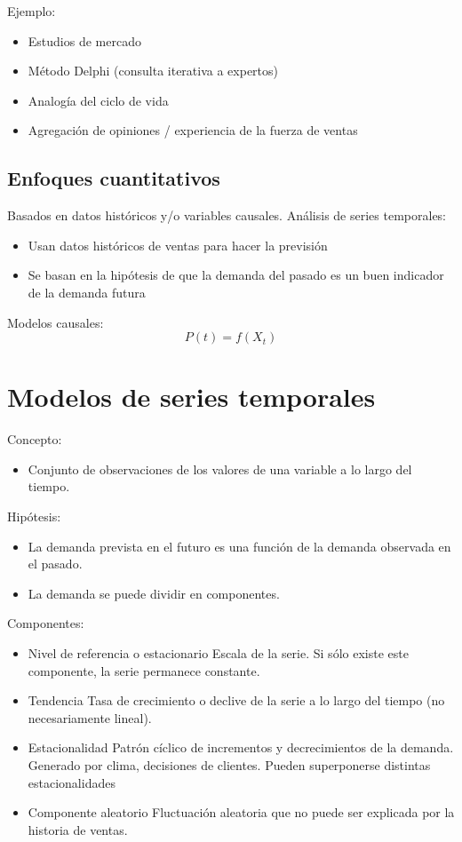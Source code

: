 Ejemplo:
\begin{itemize}
    \item Estudios de mercado
    \item Método Delphi (consulta iterativa a expertos)
    \item Analogía del ciclo de vida
    \item Agregación de opiniones / experiencia de la fuerza de ventas
\end{itemize}

\subsection{Enfoques cuantitativos}
Basados en datos históricos y/o variables causales. 
Análisis de series temporales:
\begin{itemize}
    \item Usan datos históricos de ventas para hacer la previsión
    \item Se basan en la hipótesis de que la demanda del pasado es un buen indicador de la demanda futura
\end{itemize}

Modelos causales:
\begin{equation}
    P(t) = f(X_t)
\end{equation}

\section{Modelos de series temporales}
Concepto: 
\begin{itemize}
    \item Conjunto de observaciones de los valores de una variable a lo largo del tiempo.
\end{itemize}

Hipótesis:
\begin{itemize}
    \item La demanda prevista en el futuro es una función de la demanda observada en el pasado.
    \item La demanda se puede dividir en componentes.
\end{itemize}

Componentes:
\begin{itemize}
    \item Nivel de referencia o estacionario
    \subitem Escala de la serie. Si sólo existe este componente, la serie permanece constante.
    \item Tendencia
    \subitem Tasa de crecimiento o declive de la serie a lo largo del tiempo (no necesariamente lineal).
    \item Estacionalidad
    \subitem Patrón cíclico de incrementos y decrecimientos de la demanda.
    \subitem Generado por clima, decisiones de clientes.
    \subitem Pueden superponerse distintas estacionalidades
    \item Componente aleatorio
    \subitem Fluctuación aleatoria que no puede ser explicada por la historia de ventas.
\end{itemize}

